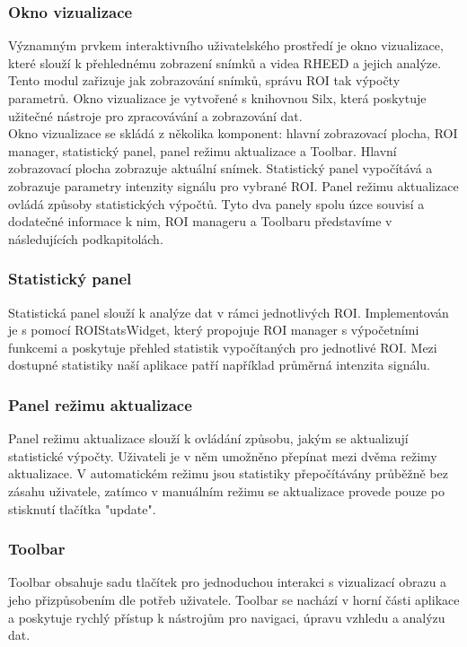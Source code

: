 \documentclass{article}
\begin{document}
\subsubsection{Okno vizualizace}
Významným prvkem interaktivního uživatelského prostředí je okno vizualizace, které slouží k přehlednému zobrazení snímků a videa RHEED a jejich analýze. Tento modul zařizuje jak zobrazování snímků, správu ROI tak výpočty parametrů. Okno vizualizace je vytvořené s knihovnou Silx, která poskytuje užitečné nástroje pro zpracovávání a zobrazování dat.\\

Okno vizualizace se skládá z několika komponent: hlavní zobrazovací plocha, ROI manager, statistický panel, panel režimu aktualizace a Toolbar. Hlavní zobrazovací plocha zobrazuje aktuální snímek. Statistický panel vypočítává a zobrazuje parametry intenzity signálu pro vybrané ROI. Panel režimu aktualizace ovládá způsoby statistických výpočtů. Tyto dva panely spolu úzce souvisí a dodatečné informace k nim, ROI manageru a Toolbaru představíme v následujících podkapitolách. 

\subsubsection{Statistický panel}
Statistická panel slouží k analýze dat v rámci jednotlivých ROI. Implementován je s pomocí ROIStatsWidget, který propojuje ROI manager s výpočetními funkcemi a poskytuje přehled statistik vypočítaných pro jednotlivé ROI. Mezi dostupné statistiky naší aplikace patří například průměrná intenzita signálu.

\subsubsection{Panel režimu aktualizace}
Panel režimu aktualizace slouží k ovládání způsobu, jakým se aktualizují statistické výpočty. Uživateli je v něm umožněno přepínat mezi dvěma režimy aktualizace. V automatickém režimu jsou statistiky přepočítávány průběžně bez zásahu uživatele, zatímco v manuálním režimu se aktualizace provede pouze po stisknutí tlačítka "update".

\subsubsection{Toolbar}
Toolbar obsahuje sadu tlačítek pro jednoduchou interakci s vizualizací obrazu a jeho přizpůsobením dle potřeb uživatele. Toolbar se nachází v horní části aplikace a poskytuje rychlý přístup k nástrojům pro navigaci, úpravu vzhledu a analýzu dat.\\
\end{document}
